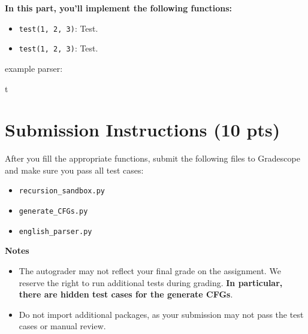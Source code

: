 \documentclass{article}
\begin{document}
\begin{tcolorbox}[enhanced,interior style={top color=Dandelion!20,bottom color=Dandelion!30}]
    \textbf{In this part, you'll implement the following functions:}
    \begin{itemize}
        \item \lstinline{test(1, 2, 3)}: Test.
        \item \lstinline{test(1, 2, 3)}: Test.
    \end{itemize}
\end{tcolorbox}







example parser:




t
\section*{Submission Instructions (10 pts)}
    After you fill the appropriate functions, submit the following files to Gradescope and make sure you pass all test cases:
    \begin{itemize}
        \item \lstinline{recursion_sandbox.py}
        \item \lstinline{generate_CFGs.py}
        \item \lstinline{english_parser.py}
    \end{itemize}

    \vspace{3mm}
    \textbf{Notes}
    \begin{itemize}
        \item The autograder may not reflect your final grade on the assignment. We reserve the right to run additional tests during grading. \textbf{In particular, there are hidden test cases for the generate CFGs}.
        \item Do not import additional packages, as your submission may not pass the test cases or manual review.
    \end{itemize}
\end{document}
